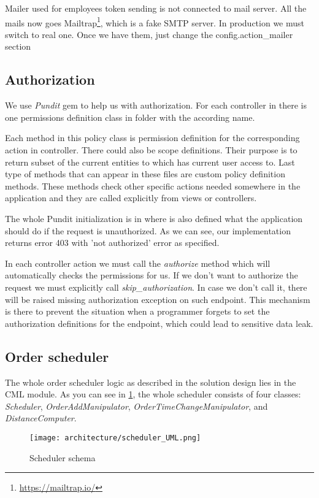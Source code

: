 		Mailer used for employees token sending is not connected to mail server. All the mails now goes Mailtrap\footnote{\url{https://mailtrap.io/}}, which is a fake SMTP server. In production we must switch to real one. Once we have them, just change the  config.action\_mailer section
		
	\label{implementation_authorization}\subsection {Authorization}
		We use \textit{Pundit} gem to help us with authorization. For each controller in  there is one permissions definition class in  folder with the according name.
		
		Each method in this policy class is permission definition for the corresponding action in controller. There could also be scope definitions. Their purpose is to return subset of the current entities to which has current user access to. Last type of methods that can appear in these files are custom policy definition methods. These methods check other specific actions needed somewhere in the application and they are called explicitly from views or controllers.
		
		The whole Pundit initialization is in  where is also defined what the application should do if the request is unauthorized. As we can see, our implementation returns error 403 with 'not authorized' error as specified.
		
		In each controller action we must call the \textit{authorize} method which will automatically checks the permissions for us. If we don't want to authorize the request we must explicitly call \textit{skip\_authorization}. In case we don't call it, there will be raised missing authorization exception on such endpoint. This mechanism is there to prevent the situation when a programmer forgets to set the authorization definitions for the endpoint, which could lead to sensitive data leak.

	\subsection{Order scheduler}
		The whole order scheduler logic as described in the solution design lies in the CML module. As you can see in \ref{scheduler-schema}, the whole scheduler consists of four classes: \textit{Scheduler}, \textit{OrderAddManipulator}, \textit{OrderTimeChangeManipulator}, and \textit{DistanceComputer}. 
		\begin{figure}[h]\centering
			\texttt{[image: architecture/scheduler\_UML.png]}
			\caption{Scheduler schema} 
			\label{scheduler-schema}
		\end{figure} 
	
